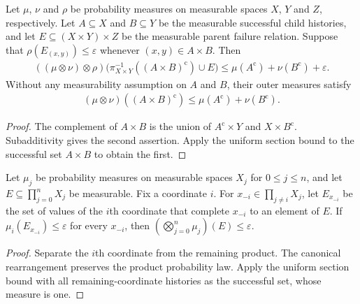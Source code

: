 \begin{lemma}
    \label{lem:binary_sampling_sections}
    \leanok
    Let $\mu$, $\nu$ and $\rho$ be probability measures on measurable
    spaces $X$, $Y$ and $Z$, respectively. Let $A\subseteq X$ and
    $B\subseteq Y$ be the measurable successful child histories, and let
    $E\subseteq(X\times Y)\times Z$ be the measurable parent failure
    relation. Suppose that $\rho(E_{(x,y)})\le\varepsilon$ whenever
    $(x,y)\in A\times B$. Then
    \begin{align}
        ((\mu\otimes\nu)\otimes\rho)
        \bigl(\pi_{X\times Y}^{-1}((A\times B)^{\mathrm c})\cup E\bigr)
        \le \mu(A^{\mathrm c})+\nu(B^{\mathrm c})+\varepsilon.
    \end{align}
    Without any measurability assumption on $A$ and $B$, their outer
    measures satisfy
    \begin{align}
        (\mu\otimes\nu)((A\times B)^{\mathrm c})
        \le\mu(A^{\mathrm c})+\nu(B^{\mathrm c}).
    \end{align}
\end{lemma}
\begin{proof}\leanok
    The complement of $A\times B$ is the union of
    $A^{\mathrm c}\times Y$ and $X\times B^{\mathrm c}$.
    Subadditivity gives the second assertion. Apply the uniform section
    bound to the successful set $A\times B$ to obtain the first.
\end{proof}


\begin{lemma}
    \label{lem:finite_product_sampling_sections}
    \leanok
    Let $\mu_j$ be probability measures on measurable spaces $X_j$ for
    $0\le j\le n$, and let $E\subseteq\prod_{j=0}^n X_j$ be measurable.
    Fix a coordinate $i$. For $x_{-i}\in\prod_{j\ne i}X_j$, let
    $E_{x_{-i}}$ be the set of values of the $i$th coordinate that complete
    $x_{-i}$ to an element of $E$. If
    $\mu_i(E_{x_{-i}})\le\varepsilon$ for every $x_{-i}$, then
    $(\bigotimes_{j=0}^n\mu_j)(E)\le\varepsilon$.
\end{lemma}
\begin{proof}\leanok
    Separate the $i$th coordinate from the remaining product. The
    canonical rearrangement preserves the product probability law.
    Apply the uniform section bound with all remaining-coordinate
    histories as the successful set, whose measure is one.
\end{proof}


